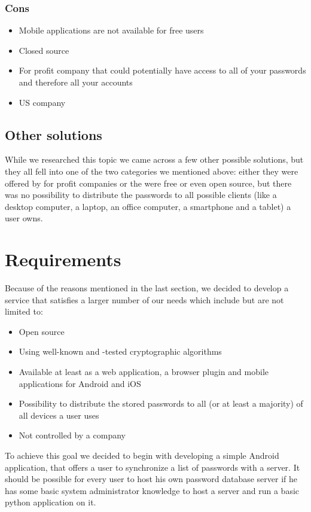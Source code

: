 \documentclass{report}
\begin{document}
\subsubsection{Cons}
\begin{itemize}
	\item Mobile applications are not available for free users
	\item Closed source
	\item For profit company that could potentially have access to all of your passwords and therefore all your accounts
	\item US company
\end{itemize}

\subsection{Other solutions}
While we researched this topic we came across a few other possible solutions, but they all fell into one of the two categories we mentioned above: either they were offered by for profit companies or the were free or even open source, but there was no possibility to distribute the passwords to all possible clients (like a desktop computer, a laptop, an office computer, a smartphone and a tablet) a user owns.

\section{Requirements}
Because of the reasons mentioned in the last section, we decided to develop a service that satisfies a larger number of our needs which include but are not limited to:

\begin{itemize}
	\item Open source
	\item Using well-known and -tested cryptographic algorithms
	\item Available at least as a web application, a browser plugin and mobile applications for Android and iOS
	\item Possibility to distribute the stored passwords to all (or at least a majority) of all devices a user uses
	\item Not controlled by a company
\end{itemize}

To achieve this goal we decided to begin with developing a simple Android application, that offers a user to synchronize a list of passwords with a server. It should be possible for every user to host his own password database server if he has some basic system administrator knowledge to host a server and run a basic python application on it.
\end{document}
